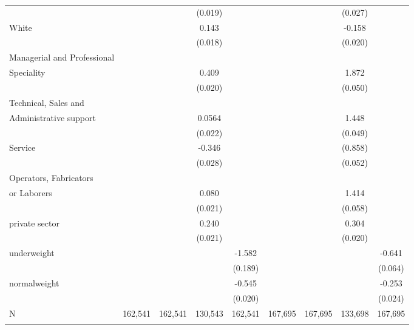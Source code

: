 \documentclass{article}
\begin{document}
\begin{center}
{{\begin{tabular}{lcccccccc}
& & & (0.019) & & & & (0.027)& \\
White & & & 0.143\textnormal{\superscript{***}} & & & & -0.158\textnormal{\superscript{***}}& \\
& & & (0.018) & & & &(0.020) & \\
Managerial and Professional \\
Speciality& & & 0.409\textnormal{\superscript{***}} & & & & 1.872\textnormal{\superscript{***}} & \\
& & & (0.020) & & & & (0.050) & \\
Technical, Sales and \\
Administrative support & & & 0.0564 \textnormal{\superscript{**}}& & & & 1.448\textnormal{\superscript{***}} & \\
& & & (0.022) & & & & (0.049) & \\
Service & & & -0.346\textnormal{\superscript{***}} & & & &(0.858)\textnormal{\superscript{***}} & \\
& & & (0.028) & & & & (0.052)& \\
Operators, Fabricators \\
or Laborers & & &0.080\textnormal{\superscript{***}} & & & & 1.414\textnormal{\superscript{***}} & \\
& & &(0.021) & & & & (0.058) & \\
private sector & & & 0.240\textnormal{\superscript{***}} & & & & 0.304\textnormal{\superscript{***}}& \\
& & & (0.021) & & & &(0.020) & \\
underweight & & & & -1.582\textnormal{\superscript{***}} & & & & -0.641\textnormal{\superscript{***}} \\
& & & & (0.189) & & & & (0.064)\\
normalweight & & & & -0.545\textnormal{\superscript{***}} & & & & -0.253\textnormal{\superscript{***}} \\
& & & & (0.020) & & & & (0.024)\\
N & 162,541 & 162,541 & 130,543 & 162,541 & 167,695 & 167,695 & 133,698 & 167,695 \\
\cline{1-9} \\
\end{tabular}}}
\end{center}
\vspace{-0.1cm}
\end{document}
